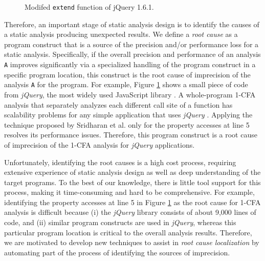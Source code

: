 

\begin{figure}[th!]
        
\caption{\textmd{Modifed {\tt extend} function of jQuery 1.6.1.}}
\label{fig:jquery-modified}
\end{figure}

Therefore, an important stage of static analysis design is to identify the causes of a static analysis producing unexpected results. We define a {\it root cause} as a program construct that is a source of the precision and/or performance loss for a static analysis. Specifically, if the overall precision and performance of an analysis {\tt A} improves significantly via a specialized handling of the program construct in a specific program location, this construct is the root cause of imprecision of the analysis {\tt A} for the program. For example, Figure \ref{fig:jquery-modified} shows a small piece of code from {\it jQuery}, the most widely used JavaScript library \cite{LibraryUsage}. A whole-program 1-CFA analysis \cite{Shivers:1991:CAH:124950} that separately analyzes each different call site of a function has scalability problems for any simple application that uses {\it jQuery} \cite{Sridharan:2012:CTP:2367163.2367191}. Applying the technique proposed by Sridharan et al. \cite{Sridharan:2012:CTP:2367163.2367191} only for the property accesses at line 5 resolves its performance issues. Therefore, this program construct is a root cause of imprecision of the 1-CFA analysis for {\it jQuery} applications.

Unfortunately, identifying the root causes is a high cost process, requiring extensive experience of static analysis design as well as deep understanding of the target programs. To the best of our knowledge, there is little tool support for this process, making it time-consuming and hard to be comprehensive. For example, identifying the property accesses at line 5 in Figure \ref{fig:jquery-modified} as the root cause for 1-CFA analysis is difficult because (i) the {\it jQuery} library consists of about 9,000 lines of code, and (ii) similar program constructs are used in {\it jQuery}, whereas this particular program location is critical to the overall analysis results. Therefore, we are motivated to develop new techniques to assist in {\it root cause localization} by automating part of the process of identifying the sources of imprecision.

